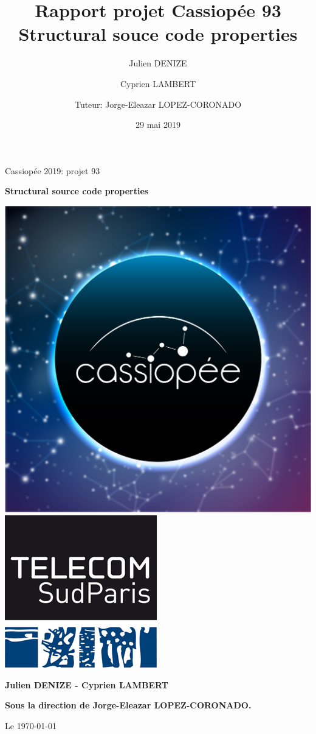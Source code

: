 \documentclass[a4paper, titlepage]{report}
\title{Rapport projet Cassiopée 93\\ \large Structural souce code properties}      %
\author{Julien DENIZE \and Cyprien LAMBERT \\ \and Tuteur: Jorge-Eleazar LOPEZ-CORONADO}           %
\date{29 mai 2019}           %
\begin{document}
\begin{titlepage}
    \parindent=0pt
    Cassiopée 2019: projet 93 
    \begin{center}\bfseries\Huge
        Structural source code properties
    \end{center}
    \vspace*{1cm}
    \begin{center}
        \includegraphics[scale=0.2]{images/iconcassiopee}
        \includegraphics[scale=0.81]{images/tsp}
        \end{center}
    \begin{center}\bfseries\Large
    Julien DENIZE - Cyprien LAMBERT
    \end{center}
        
    \begin{center}\bfseries\Large
    Sous la direction de Jorge-Eleazar LOPEZ-CORONADO.
    \end{center}
    \begin{flushright}
            Le \today 
    \end{flushright}
\end{titlepage}
\tableofcontents
\end{document}
